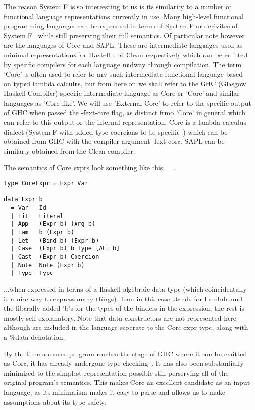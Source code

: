 The reason System F is so intereesting to us is its similarity to a number of functional
language representations currently in use. Many high-level functional programming languages
can be expressed in terms of System F or derivites of System F~\cite{SystemF} while still 
preserving their full semantics. Of
particular note however are the languages of Core and SAPL. These are intermediate languages
used as minimal representations for Haskell and Clean respectively which can be emitted by
specific compilers for each language midway through compilation. The term 'Core' is often
used to refer to any such intermediate functional language based on typed lambda calculus,
but from here on we shall refer to the GHC (Glasgow Haskell Compiler) specific intermediate
language as Core or 'Core' and similar languages as 'Core-like'. We will use 'External 
Core' to refer to the specific output of GHC when passed the -fext-core flag, as distinct
frmo 'Core' in general which can refer to this output or the internal representation. 
Core is a lambda calculus dialect (System F with added type coercions to be 
specific~\cite{Ext-Core}) which can be obtained from GHC with the compiler argument 
-fext-core. SAPL can be similarly obtained from the Clean compiler. 


\noindent The semantics of Core exprs look something like this
~\cite{GHCCoreSyntax}~\cite[pp.9]{Inliner}..

\begin{verbatim}
type CoreExpr = Expr Var

data Expr b 
  = Var	  Id
  | Lit   Literal
  | App   (Expr b) (Arg b)
  | Lam   b (Expr b)
  | Let   (Bind b) (Expr b)
  | Case  (Expr b) b Type [Alt b]
  | Cast  (Expr b) Coercion
  | Note  Note (Expr b)
  | Type  Type
\end{verbatim}

\noindent ...when expressed in terms of a Haskell algebraic data type (which 
coincidentally is a nice way to express many things). Lam in this
case stands for Lambda and the liberally added 'b's for the types of the binders
in the expression, the rest is mostly self explanatory. Note that data constructors
are not represented here although are included in the language seperate to the
Core expr type, along with a \%data denotation.

By the time a source program reaches the stage of GHC where it can be emitted
as Core, it has already undergone type checking~\cite{Inliner}. It has also 
been substantially minimized to the simplest representation
possible still perserving all of the original program's semantics. This makes
Core an excellent candidate as an input language, as its minimalism makes it
easy to parse and allows us to make assumptions about its type safety.

